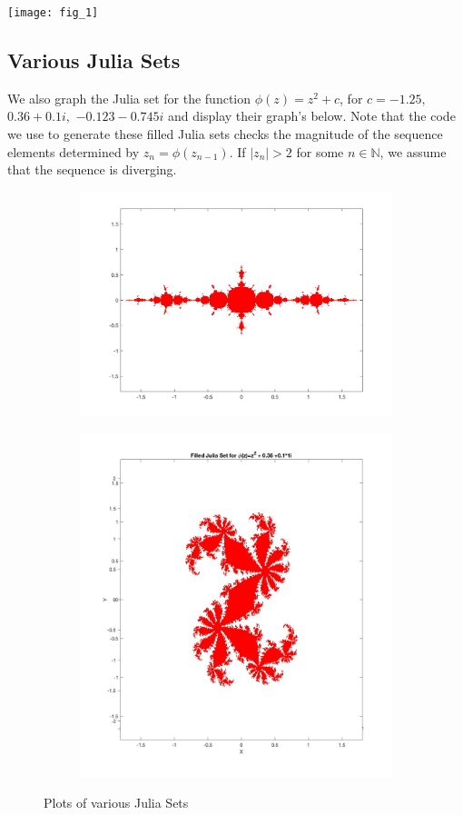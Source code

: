 \documentclass[12pt]{article}
\def\N{\mathbb{N}}
\begin{document}
				
		
			\begin{center}
			\texttt{[image: fig\_1]}
			\end{center}
	
\subsection{Various Julia Sets} \label{prob2}	
	
	We also graph the Julia set for the function $\phi(z)=z^2+c$, for $c=-1.25,$ $0.36+0.1i,$ $-0.123-0.745i$ and display their graph's below. Note that the code we use to generate these filled Julia sets checks the magnitude of the sequence elements determined by $z_n=\phi(z_{n-1})$. If $|z_n|>2$ for some $n\in \N$, we assume that the sequence is diverging. 

\begin{figure}[!]
	\centering	
	\begin{subfigure}{0.5\textwidth}
		\centering
		\includegraphics[width=0.7\linewidth]{Julia_Set_1}
		\caption{}
		\label{fig:juliaset1}
	\end{subfigure}
	
	\begin{subfigure}{0.5\textwidth}
		\centering
		\includegraphics[width=0.7\linewidth]{JuliaSet_4}
		\caption{}
		\label{fig:juliaset4}
	\end{subfigure}
	\caption{Plots of various Julia Sets}
\end{figure}
\end{document}

